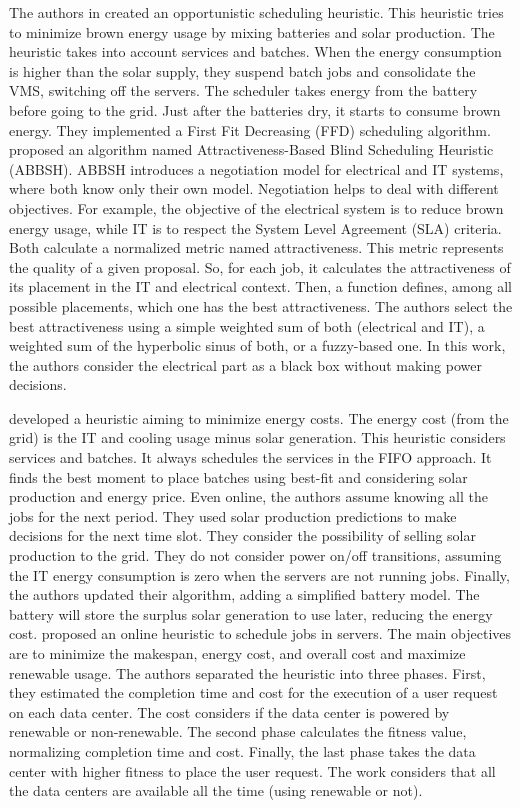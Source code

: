 The authors in \cite{li2017balancing} created an opportunistic scheduling heuristic. This heuristic tries to minimize brown energy usage by mixing batteries and solar production. The heuristic takes into account services and batches. When the energy consumption is higher than the solar supply, they suspend batch jobs and consolidate the VMS, switching off the servers. The scheduler takes energy from the battery before going to the grid. Just after the batteries dry, it starts to consume brown energy. They implemented a First Fit Decreasing (FFD) scheduling algorithm. \citeauthor{grange2018green} \cite{grange2018green} proposed an algorithm named Attractiveness-Based Blind Scheduling Heuristic (ABBSH). ABBSH introduces a negotiation model for electrical and IT systems, where both know only their own model. Negotiation helps to deal with different objectives. For example, the objective of the electrical system is to reduce brown energy usage, while IT is to respect the System Level Agreement (SLA) criteria. Both calculate a normalized metric named attractiveness. This metric represents the quality of a given proposal. So, for each job, it calculates the attractiveness of its placement in the IT and electrical context. Then, a function defines, among all possible placements, which one has the best attractiveness. The authors select the best attractiveness using a simple weighted sum of both (electrical and IT), a weighted sum of the hyperbolic sinus of both, or a fuzzy-based one. In this work, the authors consider the electrical part as a black box without making power decisions.

\citeauthor{haghshenas2020infrastructure} \cite{haghshenas2020infrastructure} developed a heuristic aiming to minimize energy costs. The energy cost (from the grid) is the IT and cooling usage minus solar generation. This heuristic considers services and batches. It always schedules the services in the FIFO approach. It finds the best moment to place batches using best-fit and considering solar production and energy price. Even online, the authors assume knowing all the jobs for the next period. They used solar production predictions to make decisions for the next time slot. They consider the possibility of selling solar production to the grid. They do not consider power on/off transitions, assuming the IT energy consumption is zero when the servers are not running jobs. Finally, the authors updated their algorithm, adding a simplified battery model. The battery will store the surplus solar generation to use later, reducing the energy cost. \cite{nayak2021efficient} proposed an online heuristic to schedule jobs in servers. The main objectives are to minimize the makespan, energy cost, and overall cost and maximize renewable usage. The authors separated the heuristic into three phases. First, they estimated the completion time and cost for the execution of a user request on each data center. The cost considers if the data center is powered by renewable or non-renewable. The second phase calculates the fitness value, normalizing completion time and cost. Finally, the last phase takes the data center with higher fitness to place the user request. The work considers that all the data centers are available all the time (using renewable or not).

